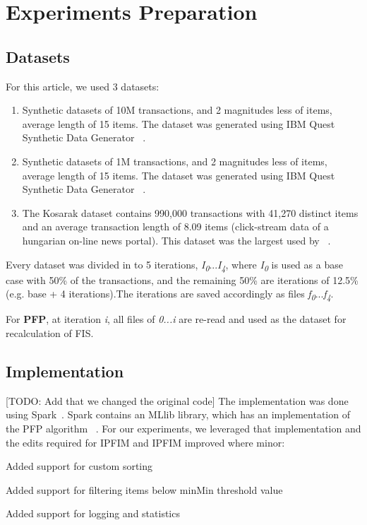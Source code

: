 \section{Experiments Preparation}

\subsection{Datasets}
For this article, we used 3 datasets:
\begin{enumerate}[label=\textbf{Dataset.\arabic*}]
\item  \label{data:10Msynt} Synthetic datasets of 10M transactions, and 2 magnitudes less of items, average length of 15 items. The dataset was generated using IBM Quest Synthetic Data Generator ~\cite{agrawal1994quest}. 
\item \label{data:1Msynt} Synthetic datasets of 1M transactions, and 2 magnitudes less of items, average length of 15 items. The dataset was generated using IBM Quest Synthetic Data Generator ~\cite{agrawal1994quest}. 
\item \label{data:kosarak} The Kosarak dataset contains 990,000 transactions with 41,270 distinct items and an average transaction length of 8.09 items (click-stream data of a hungarian on-line news portal). This dataset was the largest used by ~\cite{tanbeer2009efficient}.
\end{enumerate}


Every dataset was divided in to 5 iterations, \textit{I\textsubscript{0}}...\textit{I\textsubscript{4}}, where \textit{I\textsubscript{0}} is used as a base case with 50\% of the transactions, and the remaining 50\% are iterations of 12.5\% (e.g. base + 4 iterations).The iterations are saved accordingly as files \textit{f\textsubscript{0}}...\textit{f\textsubscript{4}}. 

For \textbf{PFP}, at iteration \textit{i}, all files of \textit{0...i} are re-read and used as the dataset for recalculation of FIS.

\subsection{Implementation}
[TODO: Add that we changed the original code]
The implementation was done using Spark~\cite{spark}. Spark contains an MLlib library, which has an implementation of the PFP algorithm ~\cite{mllibpfp}. For our experiments, we leveraged that implementation and the edits required for IPFIM and IPFIM improved where minor:
\begin{steps}
\item Added support for custom sorting
\item Added support for filtering items below minMin threshold value
\item Added support for logging and statistics
\end{steps}

